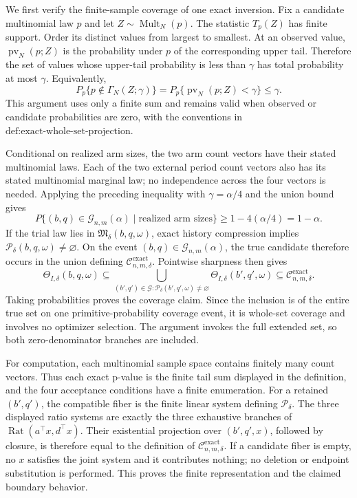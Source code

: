 We first verify the finite-sample coverage of one exact inversion.  Fix a candidate multinomial law \(p\) and let \(Z\sim\operatorname{Mult}_N(p)\).  The statistic \(T_p(Z)\) has finite support.  Order its distinct values from largest to smallest.  At an observed value, \(\operatorname{pv}_N(p;Z)\) is the probability under \(p\) of the corresponding upper tail.  Therefore the set of values whose upper-tail probability is less than \(\gamma\) has total probability at most \(\gamma\).  Equivalently,
\[
P_p\{p\notin\Gamma_N(Z;\gamma)\}
=P_p\{\operatorname{pv}_N(p;Z)<\gamma\}\leq\gamma.
\]
This argument uses only a finite sum and remains valid when observed or candidate probabilities are zero, with the conventions in \(\text{def:exact-whole-set-projection}\).

Conditional on realized arm sizes, the two arm count vectors have their stated multinomial laws.  Each of the two external period count vectors also has its stated multinomial marginal law; no independence across the four vectors is needed.  Applying the preceding inequality with \(\gamma=\alpha/4\) and the union bound gives
\[
P\{(b,q)\in\mathcal G_{n,m}(\alpha)\mid\text{realized arm sizes}\}
\geq1-4(\alpha/4)=1-\alpha.
\]
If the trial law lies in \(\mathfrak M_\delta(b,q,\omega)\), exact history compression implies \(\mathcal P_\delta(b,q,\omega)\ne\varnothing\).  On the event \((b,q)\in\mathcal G_{n,m}(\alpha)\), the true candidate therefore occurs in the union defining \(\mathcal C_{n,m,\delta}^{\mathrm{exact}}\).  Pointwise sharpness then gives
\[
\Theta_{I,\delta}(b,q,\omega)
\subseteq\bigcup_{(b',q')\in\mathcal G:\mathcal P_\delta(b',q',\omega)\ne\varnothing}
\Theta_{I,\delta}(b',q',\omega)
\subseteq\mathcal C_{n,m,\delta}^{\mathrm{exact}}.
\]
Taking probabilities proves the coverage claim.  Since the inclusion is of the entire true set on one primitive-probability coverage event, it is whole-set coverage and involves no optimizer selection.  The argument invokes the full extended set, so both zero-denominator branches are included.

For computation, each multinomial sample space contains finitely many count vectors.  Thus each exact p-value is the finite tail sum displayed in the definition, and the four acceptance conditions have a finite enumeration.  For a retained \((b',q')\), the compatible fiber is the finite linear system defining \(\mathcal P_\delta\).  The three displayed ratio systems are exactly the three exhaustive branches of \(\operatorname{Rat}(a^\top x,d^\top x)\).  Their existential projection over \((b',q',x)\), followed by closure, is therefore equal to the definition of \(\mathcal C_{n,m,\delta}^{\mathrm{exact}}\).  If a candidate fiber is empty, no \(x\) satisfies the joint system and it contributes nothing; no deletion or endpoint substitution is performed.  This proves the finite representation and the claimed boundary behavior.
